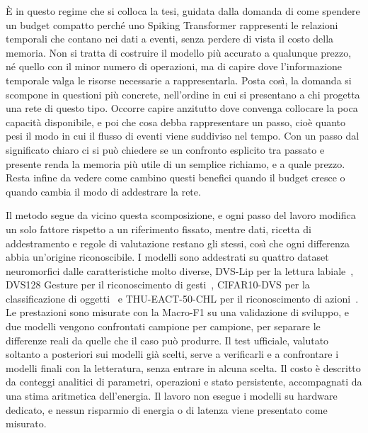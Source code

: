 È in questo regime che si colloca la tesi, guidata dalla domanda di come spendere un budget compatto perché uno Spiking Transformer rappresenti le relazioni temporali che contano nei dati a eventi, senza perdere di vista il costo della memoria. Non si tratta di costruire il modello più accurato a qualunque prezzo, né quello con il minor numero di operazioni, ma di capire dove l'informazione temporale valga le risorse necessarie a rappresentarla. Posta così, la domanda si scompone in questioni più concrete, nell'ordine in cui si presentano a chi progetta una rete di questo tipo. Occorre capire anzitutto dove convenga collocare la poca capacità disponibile, e poi che cosa debba rappresentare un passo, cioè quanto pesi il modo in cui il flusso di eventi viene suddiviso nel tempo. Con un passo dal significato chiaro ci si può chiedere se un confronto esplicito tra passato e presente renda la memoria più utile di un semplice richiamo, e a quale prezzo. Resta infine da vedere come cambino questi benefici quando il budget cresce o quando cambia il modo di addestrare la rete.

Il metodo segue da vicino questa scomposizione, e ogni passo del lavoro modifica un solo fattore rispetto a un riferimento fissato, mentre dati, ricetta di addestramento e regole di valutazione restano gli stessi, così che ogni differenza abbia un'origine riconoscibile. I modelli sono addestrati su quattro dataset neuromorfici dalle caratteristiche molto diverse, DVS-Lip per la lettura labiale~\cite{tan2022dvslip}, DVS128 Gesture per il riconoscimento di gesti~\cite{amir2017dvsgesture}, CIFAR10-DVS per la classificazione di oggetti~\cite{li2017cifar10dvs} e THU-EACT-50-CHL per il riconoscimento di azioni~\cite{gao2023action}. Le prestazioni sono misurate con la Macro-F1 su una validazione di sviluppo, e due modelli vengono confrontati campione per campione, per separare le differenze reali da quelle che il caso può produrre. Il test ufficiale, valutato soltanto a posteriori sui modelli già scelti, serve a verificarli e a confrontare i modelli finali con la letteratura, senza entrare in alcuna scelta. Il costo è descritto da conteggi analitici di parametri, operazioni e stato persistente, accompagnati da una stima aritmetica dell'energia. Il lavoro non esegue i modelli su hardware dedicato, e nessun risparmio di energia o di latenza viene presentato come misurato.

